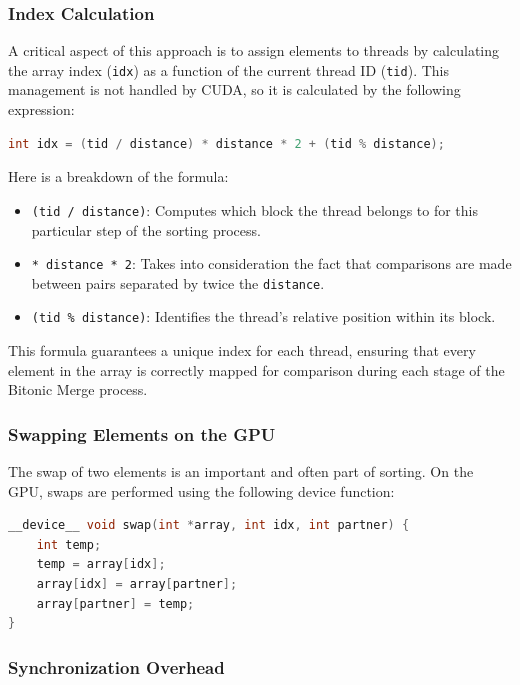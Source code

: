 \documentclass[a4paper,12pt]{article}
\begin{document}
 



\subsubsection*{Index Calculation}

A critical aspect of this approach is to assign elements to threads by calculating the array index (\texttt{idx}) as a function of the current thread ID (\texttt{tid}). This management is not handled by CUDA, so it is calculated by the following expression:
\\
\begin{lstlisting}[language=C]
int idx = (tid / distance) * distance * 2 + (tid % distance);
\end{lstlisting}

Here is a breakdown of the formula:
\begin{itemize}
    \item \texttt{(tid / distance)}: Computes which block the thread belongs to for this particular step of the sorting process.
    \item \texttt{* distance * 2}: Takes into consideration the fact that comparisons are made between pairs separated by twice the \texttt{distance}.
    \item \texttt{(tid \% distance)}: Identifies the thread’s relative position within its block.
\end{itemize}

This formula guarantees a unique index for each thread, ensuring that every element in the array is correctly mapped for comparison during each stage of the Bitonic Merge process.

\subsubsection*{Swapping Elements on the GPU}

The swap of two elements is an important and often part of sorting. On the GPU, swaps are performed using the following device function:
\\
\begin{lstlisting}[language=C]
__device__ void swap(int *array, int idx, int partner) {
    int temp;
    temp = array[idx];
    array[idx] = array[partner];
    array[partner] = temp;
}
\end{lstlisting}


\subsubsection*{Synchronization Overhead}
\end{document}
